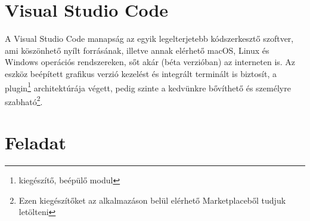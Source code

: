 \section{Visual Studio Code}
A Visual Studio Code manapság az egyik legelterjetebb kódszerkesztő szoftver, ami köszönhető nyílt forrásának, illetve annak elérhető macOS, Linux és Windows operációs rendszereken, sőt akár (béta verzióban) az interneten is. Az eszköz beépített grafikus verzió kezelést és integrált terminált is biztosít, a plugin\footnote{kiegészítő, beépülő modul} architektúrája végett, pedig szinte a kedvünkre bővíthető és személyre szabható\footnote{Ezen kiegészítőket az alkalmazáson belül elérhető Marketplaceből tudjuk letölteni}.

\section{Feladat}